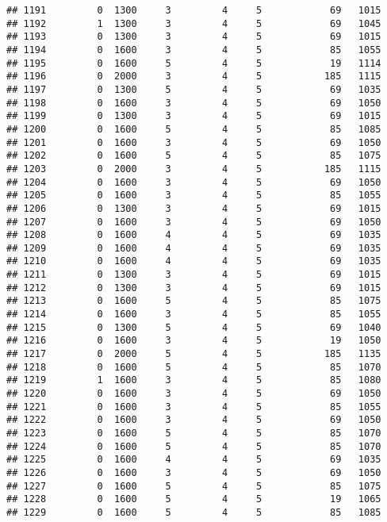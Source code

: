 \documentclass[]{article}
\begin{document}
\begin{verbatim}
## 1191         0  1300     3         4     5            69   1015
## 1192         1  1300     3         4     5            69   1045
## 1193         0  1300     3         4     5            69   1015
## 1194         0  1600     3         4     5            85   1055
## 1195         0  1600     5         4     5            19   1114
## 1196         0  2000     3         4     5           185   1115
## 1197         0  1300     5         4     5            69   1035
## 1198         0  1600     3         4     5            69   1050
## 1199         0  1300     3         4     5            69   1015
## 1200         0  1600     5         4     5            85   1085
## 1201         0  1600     3         4     5            69   1050
## 1202         0  1600     5         4     5            85   1075
## 1203         0  2000     3         4     5           185   1115
## 1204         0  1600     3         4     5            69   1050
## 1205         0  1600     3         4     5            85   1055
## 1206         0  1300     3         4     5            69   1015
## 1207         0  1600     3         4     5            69   1050
## 1208         0  1600     4         4     5            69   1035
## 1209         0  1600     4         4     5            69   1035
## 1210         0  1600     4         4     5            69   1035
## 1211         0  1300     3         4     5            69   1015
## 1212         0  1300     3         4     5            69   1015
## 1213         0  1600     5         4     5            85   1075
## 1214         0  1600     3         4     5            85   1055
## 1215         0  1300     5         4     5            69   1040
## 1216         0  1600     3         4     5            19   1050
## 1217         0  2000     5         4     5           185   1135
## 1218         0  1600     5         4     5            85   1070
## 1219         1  1600     3         4     5            85   1080
## 1220         0  1600     3         4     5            69   1050
## 1221         0  1600     3         4     5            85   1055
## 1222         0  1600     3         4     5            69   1050
## 1223         0  1600     5         4     5            85   1070
## 1224         0  1600     5         4     5            85   1070
## 1225         0  1600     4         4     5            69   1035
## 1226         0  1600     3         4     5            69   1050
## 1227         0  1600     5         4     5            85   1075
## 1228         0  1600     5         4     5            19   1065
## 1229         0  1600     5         4     5            85   1085

\end{verbatim}
\end{document}
